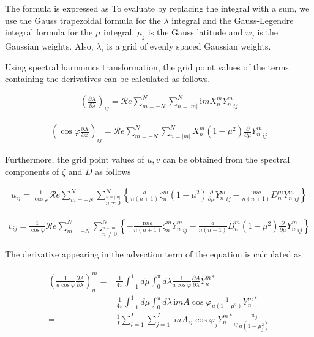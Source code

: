 The formula is expressed as To evaluate by replacing the integral with a sum, we use the Gauss trapezoidal formula for the \(\lambda\) integral and the Gauss-Legendre integral formula for the \(\mu\)
integral. \(\mu_j\) is the Gauss latitude and \(w_j\) is the Gaussian weights. Also, \(\lambda_i\) is a grid of evenly spaced Gaussian weights.

Using spectral harmonics transformation, the grid point values of the terms containing the derivatives can be calculated as follows.

\begin{eqnarray}
        \left(  \frac{\partial X}{\partial \lambda} \right)_{ij}
     =
        {\mathcal Re} \sum_{m=-N}^{N} \sum_{n=|m|}^{N}
       \mathrm{i}m X_n^m {Y_n^m}_{ij}
\end{eqnarray}

\begin{eqnarray}
   \left( \cos\varphi \frac{\partial X}{\partial \varphi} \right)_{ij}
     =  {\mathcal Re} \sum_{m=-N}^{N} \sum_{n=|m|}^{N}
       X_n^m
       ( 1-\mu^{2} ) \frac{\partial }{\partial \mu} {Y_n^m}_{ij}
\end{eqnarray}

Furthermore, the grid point values of \(u,v\) can be obtained from the spectral components of \(\zeta\) and \(D\) as follows

\begin{eqnarray}
  u_{ij}
  = \frac{1}{\cos\varphi}
     {\mathcal Re} \sum_{m=-N}^{N}
                       \sum_{\stackrel{n=|m|}{n \neq 0}}^{N}
    \left\{
             \frac{a}{n(n+1)} \zeta_n^m
            (1-\mu^{2}) \frac{\partial{}}{\partial {\mu}} {Y_n^m}_{ij}
          -  \frac{\mathrm{i}m a}{n(n+1)} D_n^m {Y_n^m}_{ij}
    \right\}
\end{eqnarray}

\begin{eqnarray}
  v_{ij}
  = \frac{1}{\cos\varphi}
   {\mathcal Re} \sum_{m=-N}^{N}
                     \sum_{\stackrel{n=|m|}{n \neq 0}}^{N}
    \left\{
          -  \frac{\mathrm{i}m a}{n(n+1)} \zeta_n^m {Y_n^m}_{ij}
          -  \frac{a}{n(n+1)} D_n^m
            (1-\mu^{2}) \frac{\partial{}}{\partial {\mu}} {Y_n^m}_{ij}
    \right\}
\end{eqnarray}

The derivative appearing in the advection term of the equation is calculated as

\begin{eqnarray}
\begin{aligned}
  \left( \frac{1}{a\cos\varphi} \frac{\partial{A}}{\partial {\lambda}} \right)_n^m
   =  & \frac{1}{4 \pi}
        \int_{-1}^{1} d \mu \int_{0}^{\pi} d \lambda
          \frac{1}{a\cos\varphi} \frac{\partial{A}}{\partial {\lambda}} Y_n^{m *} \\
   =  & \frac{1}{4 \pi}
        \int_{-1}^{1} d \mu \int_{0}^{\pi} d \lambda \,
          \mathrm{i}m A \cos\varphi \frac{1}{a(1-\mu^{2})} Y_n^{m *} \\
   =  & \frac{1}{I} \sum_{i=1}^{I} \sum_{j=1}^{J}
          \mathrm{i}m A_{ij} \cos\varphi_j
          {Y_n^{m *}}_{ij} \frac{w_j}{a(1-\mu_j^{2})}
\end{aligned}
\end{eqnarray}

